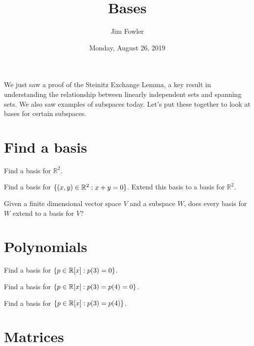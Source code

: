 \documentclass{homework}
\author{Jim Fowler}
\title{Bases}
\date{Monday, August 26, 2019}
\begin{document}
\maketitle

We just saw a proof of the Steinitz Exchange Lemma, a key result in
understanding the relationship between linearly independent sets and
spanning sets.  We also saw examples of subspaces today.
Let's put these together to look at bases for certain subspaces.

\section{Find a basis}

\begin{problem}
  Find a basis for $\mathbb{R}^2$.
\end{problem}

\vfill

\begin{problem}
  Find a basis for $\{ (x,y) \in \mathbb{R}^2 : x + y = 0 \}$.  Extend this
  basis to a basis for $\mathbb{R}^2$.
\end{problem}

\vfill

\begin{problem}
  Given a finite dimensional vector space $V$ and a subspace $W$, does
  every basis for $W$ extend to a basis for $V$?
\end{problem}

\vfill

\section{Polynomials}

\begin{problem}
  Find a basis for $\{ p \in \mathbb{R}[x] : p(3) = 0 \}$.
\end{problem}

\vfill

\begin{problem}
  Find a basis for $\{ p \in \mathbb{R}[x] : p(3) = p(4) = 0 \}$.
\end{problem}

\vfill

\begin{problem}
  Find a basis for $\{ p \in \mathbb{R}[x] : p(3) = p(4) \}$.
\end{problem}

\vfill

\section{Matrices}
\end{document}
